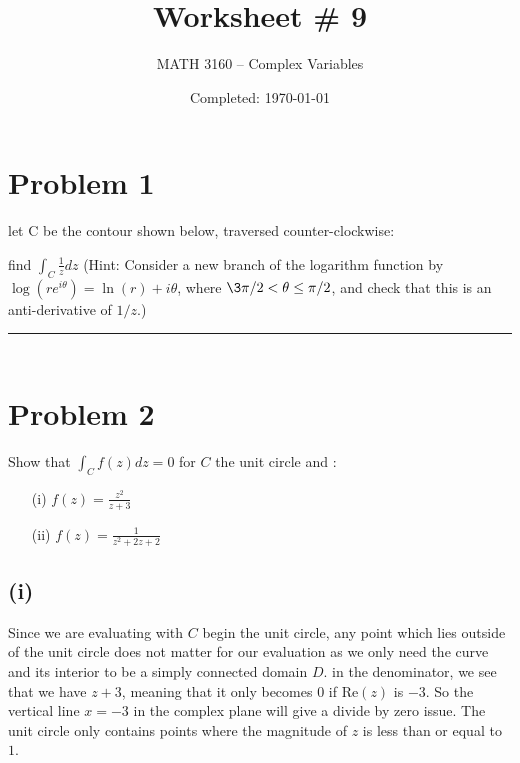 \documentclass{article}
\title{Worksheet \# 9}
\author{
  MATH 3160 -- Complex Variables\\
  \myauthor
}
\date{Completed: \today}
\begin{document}
\maketitle %


\section*{Problem 1}
let C be the contour shown below, traversed counter-clockwise:

\vspace{1cm} %


find $\int_C \frac{1}{z}dz$ (Hint: Consider a new branch of the logarithm function by $\log{(re^{i\theta})} = \ln{(r)} + i\theta$, where $\3\pi/2 < \theta \leq \pi/2$, and check that this is an anti-derivative of $1/z$.)
\vspace{1cm}
\hrule %

\begin{align*}
\end{align*}

\newpage
\section*{Problem 2}
Show that $\int_C f(z)dz = 0$ for $C$ the unit circle and :
\begin{enumerate}
  \item[(i)] $f(z) = \frac{z^2}{z+3}$
  \item[(ii)] $f(z) = \frac{1}{z^2 + 2z + 2}$
\end{enumerate}
\subsection*{(i)}
Since we are evaluating with $C$ begin the unit circle, any point which lies outside of the unit circle does not matter for our evaluation as we only need the curve and its interior to be a simply connected domain $D$. in the denominator, we see that we have $z+3$, meaning that it only becomes 0 if Re$(z)$ is $-3$. So the vertical line $x = -3$ in the complex plane will give a divide by zero issue. The unit circle only contains points where the magnitude of $z$ is less than or equal to $1$.
\end{document}
